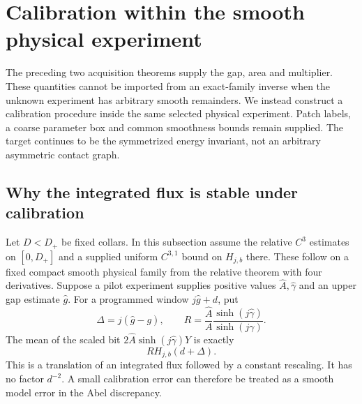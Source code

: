 \section{Calibration within the smooth physical experiment}
\label{sec:v11-calibration}
The preceding two acquisition theorems supply the gap, area and
multiplier. These quantities cannot be imported from an exact-family
inverse when the unknown experiment has arbitrary smooth remainders.
We instead construct a calibration procedure inside the same selected
physical experiment. Patch labels, a coarse parameter box and common
smoothness bounds remain supplied. The target continues to be the
symmetrized energy invariant, not an arbitrary asymmetric contact graph.

\subsection{Why the integrated flux is stable under calibration}
Let $D<D_+$ be fixed collars. In this subsection assume the relative
$C^3$ estimates on $[0,D_+]$ and a supplied uniform
$C^{3,1}$ bound on $H_{j,b}$ there. These follow on a fixed compact
smooth physical family from the relative theorem with four derivatives.
Suppose a pilot experiment supplies positive values
$\widehat A,\widehat\gamma$ and an upper gap estimate $\widehat g$.
For a programmed window $j\widehat g+d$, put
\[
 \Delta=j(\widehat g-g),\qquad
 R=\frac{\widehat A}{A}
               \frac{\sinh(j\widehat\gamma)}{\sinh(j\gamma)}.
\]
The mean of the scaled bit $2\widehat A\sinh(j\widehat\gamma)Y$
is exactly
\begin{equation}\label{eq:v11-shifted-flux}
                         R H_{j,b}(d+\Delta).
\end{equation}
This is a translation of an integrated flux followed by a constant
rescaling. It has no factor $d^{-2}$. A small calibration error can
therefore be treated as a smooth model error in the Abel discrepancy.

